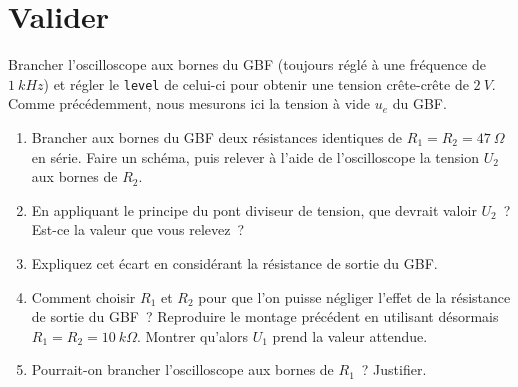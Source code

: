 \documentclass[../main/main.tex]{subfiles}
\begin{document}
\section{Valider} %

Brancher l'oscilloscope aux bornes du GBF (toujours réglé à une fréquence de
$\SI{1}{kHz}$) et régler le \texttt{level} de celui-ci pour obtenir une tension
crête-crête de $\SI{2}{V}$. Comme précédemment, nous mesurons ici la tension à
vide $u_e$ du GBF.

\noindent
\begin{minipage}[t]{.65\linewidth}
	\begin{enumerate}[label=\sqenumi, start=10]
		\item Brancher aux bornes du GBF deux résistances identiques de
		      $R_1 = R_2 = \SI{47}{\Omega}$ en série. Faire un schéma, puis relever
		      à l'aide de l'oscilloscope la tension $U_2$ aux bornes de $R_2$.
		\item En appliquant le principe du pont diviseur de tension, que devrait
		      valoir $U_2$~? Est-ce la valeur que vous relevez~?
		\item Expliquez cet écart en considérant la résistance de sortie du GBF.
		\item Comment choisir $R_1$ et $R_2$ pour que l'on puisse négliger l'effet
		      de la résistance de sortie du GBF~? Reproduire le montage précédent en
		      utilisant désormais $R_1 = R_2 = \SI{10}{k\Omega}$. Montrer qu'alors
		      $U_1$ prend la valeur attendue.
		\item Pourrait-on brancher l’oscilloscope aux bornes de $R_1$~? Justifier.
	\end{enumerate}
\end{minipage}
\hfill
\end{document}
